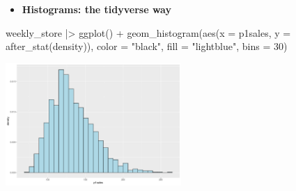 \documentclass[
  ignorenonframetext,
]{beamer}
\newenvironment{Shaded}{\begin{snugshade}}{\end{snugshade}}
\newcommand{\AttributeTok}[1]{\textcolor[rgb]{0.40,0.45,0.13}{#1}}
\newcommand{\DecValTok}[1]{\textcolor[rgb]{0.68,0.00,0.00}{#1}}
\newcommand{\FunctionTok}[1]{\textcolor[rgb]{0.28,0.35,0.67}{#1}}
\newcommand{\NormalTok}[1]{\textcolor[rgb]{0.00,0.23,0.31}{#1}}
\newcommand{\SpecialCharTok}[1]{\textcolor[rgb]{0.37,0.37,0.37}{#1}}
\newcommand{\StringTok}[1]{\textcolor[rgb]{0.13,0.47,0.30}{#1}}
\providecommand{\tightlist}{%
  \setlength{\itemsep}{0pt}\setlength{\parskip}{0pt}}\usepackage{longtable,booktabs,array}
\begin{document}
\begin{frame}[fragile]{}
\label{section-18}
\begin{itemize}
\tightlist
\item
  \textbf{Histograms: the tidyverse way}
\end{itemize}

\tiny

\begin{Shaded}
\begin{Highlighting}[]
\NormalTok{weekly\_store }\SpecialCharTok{|\textgreater{}} \FunctionTok{ggplot}\NormalTok{() }\SpecialCharTok{+} 
  \FunctionTok{geom\_histogram}\NormalTok{(}\FunctionTok{aes}\NormalTok{(}\AttributeTok{x =}\NormalTok{ p1sales, }\AttributeTok{y =} \FunctionTok{after\_stat}\NormalTok{(density)),}
                 \AttributeTok{color =} \StringTok{"black"}\NormalTok{, }\AttributeTok{fill =} \StringTok{"lightblue"}\NormalTok{, }\AttributeTok{bins =} \DecValTok{30}\NormalTok{)}
\end{Highlighting}
\end{Shaded}

\begin{center}
\includegraphics[width=0.5\textwidth,height=\textheight]{003_describing_data_files/figure-beamer/unnamed-chunk-17-1.pdf}
\end{center}
\end{frame}
\end{document}
